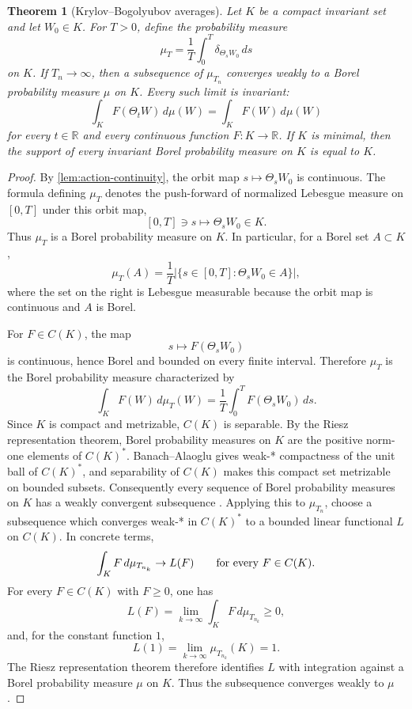 \documentclass[11pt]{amsart}
\theoremstyle{plain}
\newtheorem{theorem}{Theorem}[section]
\theoremstyle{definition}
\theoremstyle{remark}
\numberwithin{equation}{section}
\begin{document}
\begin{theorem}[Krylov--Bogolyubov averages]\label{thm:KB}
Let \(K\) be a compact invariant set and let \(W_0\in K\).  For \(T>0\), define
the probability measure
\[
   \mu_T=\frac1T\int_0^T\delta_{\Theta_sW_0}\,ds
\]
on \(K\).  If \(T_n\to\infty\), then a subsequence of \(\mu_{T_n}\) converges
weakly to a Borel probability measure \(\mu\) on \(K\).  Every such limit is
invariant:
\[
   \int_K F(\Theta_tW)\,d\mu(W)=\int_K F(W)\,d\mu(W)
\]
for every \(t\in\mathbb R\) and every continuous function \(F:K\to\mathbb R\).
If \(K\) is minimal, then the support of every invariant Borel probability
measure on \(K\) is equal to \(K\).
\end{theorem}

\begin{proof}
By \cref{lem:action-continuity}, the orbit map \(s\mapsto\Theta_sW_0\) is
continuous.  The formula defining \(\mu_T\) denotes the push-forward of
normalized Lebesgue measure on \([0,T]\) under this orbit map,
\[
   [0,T]\ni s\mapsto \Theta_sW_0\in K .
\]
Thus \(\mu_T\) is a Borel probability measure on \(K\).  In particular, for a
Borel set \(A\subset K\),
\[
   \mu_T(A)=\frac1T\left|\{s\in[0,T]:\Theta_sW_0\in A\}\right|,
\]
where the set on the right is Lebesgue measurable because the orbit map is
continuous and \(A\) is Borel.

For \(F\in C(K)\), the map
\[
   s\mapsto F(\Theta_sW_0)
\]
is continuous, hence Borel and bounded on every finite interval.  Therefore
\(\mu_T\) is the Borel probability measure characterized by
\[
   \int_K F(W)\,d\mu_T(W)
   =
   \frac1T\int_0^TF(\Theta_sW_0)\,ds .
\]
Since \(K\) is compact and metrizable, \(C(K)\) is separable.  By the Riesz
representation theorem, Borel probability measures on \(K\) are the positive
norm-one elements of \(C(K)^*\).  Banach--Alaoglu gives weak-* compactness of
the unit ball of \(C(K)^*\), and separability of \(C(K)\) makes this compact
set metrizable on bounded subsets.  Consequently every sequence of Borel
probability measures on \(K\) has a weakly convergent subsequence
\cite{Billingsley1999}.  Applying this to \(\mu_{T_n}\), choose a subsequence
which converges weak-* in \(C(K)^*\) to a bounded linear functional \(L\) on
\(C(K)\).  In concrete terms,
\[
   \int_K F\,d\mu_{T_{n_k}}\to L(F)
   \qquad\hbox{for every }F\in C(K).
\]
For every \(F\in C(K)\) with \(F\ge0\), one has
\[
   L(F)=\lim_{k\to\infty}\int_K F\,d\mu_{T_{n_k}}\ge0,
\]
and, for the constant function \(1\),
\[
   L(1)=\lim_{k\to\infty}\mu_{T_{n_k}}(K)=1 .
\]
The Riesz representation theorem therefore identifies \(L\) with integration
against a Borel probability measure \(\mu\) on \(K\).  Thus the subsequence
converges weakly to \(\mu\).


\end{proof}
\end{document}
